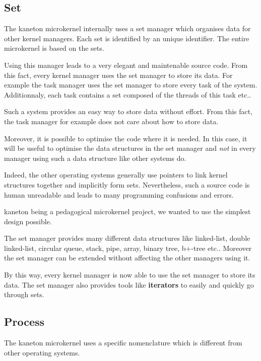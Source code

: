\begin{multicols}{2}
%
%

\subsection{Set}

The kaneton microkernel internally uses a set manager which organises data
for other kernel managers. Each set is identified by an unique identifier.
The entire microkernel is based on the sets.

Using this manager leads to a very elegant and maintenable source code. From
this fact, every kernel manager uses the set manager to store its data. For
example the task manager uses the set manager to store every task of the
system. Additionnaly, each task contains a set composed of the threads of
this task etc..

Such a system provides an easy way to store data without effort. From this
fact, the task manager for example does not care about how to store data.

Moreover, it is possible to optimise the code where it is needed. In this
case, it will be useful to optimise the data structures in the set manager
and \textit{not} in every manager using such a data structure like
other systems do.

Indeed, the other operating systems generally use pointers to link kernel
structures together and implicitly form sets. Nevertheless, such a source code
is human unreadable and leads to many programming confusions and errors.

kaneton being a pedagogical microkernel project, we wanted to use the simplest
design possible.

The set manager provides many different data structures like linked-list,
double linked-list, circular queue, stack, pipe, array, binary tree, b+-tree
etc.. Moreover the set manager can be extended without affecting the other
managers using it.

By this way, every kernel manager is now able to use the set manager to
store its data. The set manager also provides tools like \textbf{iterators}
to easily and quickly go through sets.

%
%

\subsection{Process}

The kaneton microkernel uses a specific nomenclature which is different
from other operating systems.


\end{multicols}
